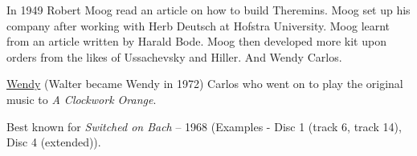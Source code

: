 In 1949 Robert Moog read an article on how to build Theremins. Moog set up his company after working with Herb Deutsch at Hofstra University. Moog learnt from an article written by Harald Bode. Moog then developed more kit upon orders from the likes of Ussachevsky and Hiller. And Wendy Carlos.

\href{http://www.wendycarlos.com/}{Wendy} (Walter became Wendy in 1972) Carlos who went on to play the original music to \textit{A Clockwork Orange}.

Best known for \textit{Switched on Bach} – 1968 (Examples - Disc 1 (track 6, track 14), Disc 4 (extended)).





